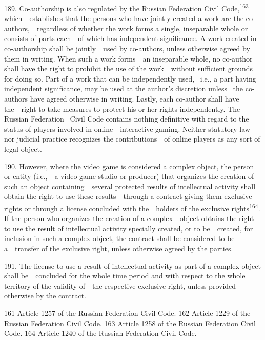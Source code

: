 \documentclass[
]{article}
\begin{document}
{189. }{Co-authorship is also regulated by the Russian Federation
}{Civil Code}{,}\textsuperscript{{163 }}{which~~establishes that the
persons who have jointly created a work are the co-authors,~~regardless
of whether the work forms a single, inseparable whole or consists of
parts each~~of which has independent significance. A work created in
co-authorship shall be jointly~~used by co-authors, unless otherwise
agreed by them in writing. When such a work forms~~an inseparable whole,
no co-author shall have the right to prohibit the use of the
work~~without sufficient grounds for doing so. Part of a work that can
be independently used, }{~i.e., a part having independent significance,
may be used at the author's discretion unless }{~the co-authors have
agreed otherwise in writing. Lastly, each co-author shall have
the~~right to take measures to protect his or her rights independently.
The Russian Federation }{~Civil Code }{contains nothing definitive with
regard to the status of players involved in online~~interactive gaming.
Neither statutory law nor judicial practice recognizes the
contributions~~of online players as any sort of legal object.}

{190. }{However, where the video game is considered a complex object,
the person or entity (i.e.,~~a video game studio or producer) that
organizes the creation of such an object containing~~several protected
results of intellectual activity shall obtain the right to use these
results~~through a contract giving them exclusive rights or through a
license concluded with the~~holders of the exclusive
rights}\textsuperscript{{164}}{. }{If the person who organizes the
creation of a complex~~object obtains the right to use the result of
intellectual activity specially created, or to be~~created, for
inclusion in such a complex object, the contract shall be considered to
be a~~transfer of the exclusive right, unless otherwise agreed by the
parties.}

{191. }{The license to use a result of intellectual activity as part of
a complex object shall be~~concluded for the whole time period and with
respect to the whole territory of the validity of~~the respective
exclusive right, unless provided otherwise by the contract.}

{161 }{Article 1257 of the Russian Federation }{Civil Code}{. }{162
}{Article 1229 of the Russian Federation }{Civil Code}{. }{163 }{Article
1258 of the Russian Federation }{Civil Code}{. }{164 }{Article 1240 of
the Russian Federation }{Civil Code}{.}
\end{document}
